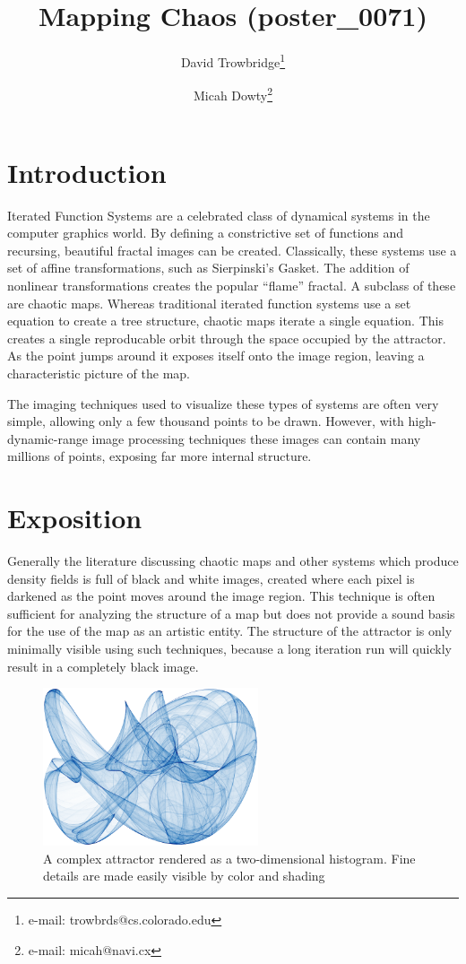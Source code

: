 \documentclass{acmsiggraph}
\title{Mapping Chaos (poster\_0071)}
\author{
  David Trowbridge\thanks{e-mail: trowbrds@cs.colorado.edu}
\and
  Micah Dowty\thanks{e-mail: micah@navi.cx}
}
\begin{document}
\maketitle

\section{Introduction}
\copyrightspace
Iterated Function Systems are a celebrated class of dynamical systems in the
computer graphics world. By defining a constrictive set of functions and
recursing, beautiful fractal images can be created. Classically, these
systems use a set of affine transformations, such as Sierpinski's Gasket.
The addition of nonlinear transformations creates the popular ``flame''
fractal. A subclass of these are chaotic maps. Whereas traditional iterated
function systems use a set equation to create a tree structure, chaotic maps
iterate a single equation. This creates a single reproducable orbit through
the space occupied by the attractor. As the point jumps around it exposes
itself onto the image region, leaving a characteristic picture of the map.

The imaging techniques used to visualize these types of systems are often
very simple, allowing only a few thousand points to be drawn. However,
with high-dynamic-range image processing techniques these images can
contain many millions of points, exposing far more internal structure.

\section{Exposition}
Generally the literature discussing chaotic maps and other systems which
produce density fields is full of black and white images, created where
each pixel is darkened as the point moves around the image region. This
technique is often sufficient for analyzing the structure of a map but
does not provide a sound basis for the use of the map as an artistic
entity. The structure of the attractor is only minimally visible using
such techniques, because a long iteration run will quickly result in a
completely black image.

\begin{figure}[ht]
\centering
\includegraphics[width=2.5in]{1.png}
\caption{A complex attractor rendered as a two-dimensional histogram.
Fine details are made easily visible by color and shading}
\end{figure}
\end{document}
